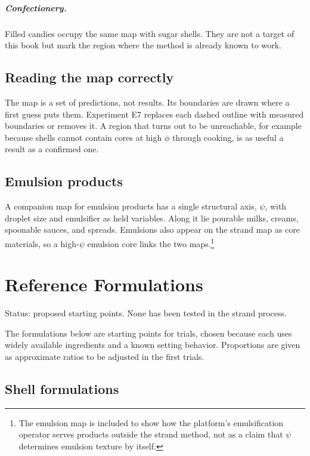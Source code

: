 \documentclass[11pt,openany]{book}
\theoremstyle{definition}
\begin{document}
\paragraph{Confectionery.} Filled candies occupy the same map with sugar shells. They are not a target of this book but mark the region where the method is already known to work.

\section{Reading the map correctly}

The map is a set of predictions, not results. Its boundaries are drawn where a first guess puts them. Experiment E7 replaces each dashed outline with measured boundaries or removes it. A region that turns out to be unreachable, for example because shells cannot contain cores at high $\phi$ through cooking, is as useful a result as a confirmed one.

\section{Emulsion products}

A companion map for emulsion products has a single structural axis, $\psi$, with droplet size and emulsifier as held variables. Along it lie pourable milks, creams, spoonable sauces, and spreads. Emulsions also appear on the strand map as core materials, so a high-$\psi$ emulsion core links the two maps.\footnote{The emulsion map is included to show how the platform's emulsification operator serves products outside the strand method, not as a claim that $\psi$ determines emulsion texture by itself.}

\chapter{Reference Formulations}\label{ch:formulations}

Status: proposed starting points. None has been tested in the strand process.

The formulations below are starting points for trials, chosen because each uses widely available ingredients and a known setting behavior. Proportions are given as approximate ratios to be adjusted in the first trials.

\section{Shell formulations}
\end{document}
